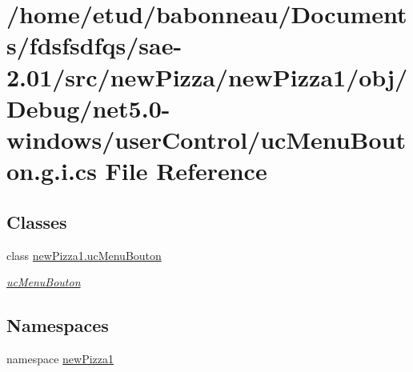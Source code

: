 \hypertarget{net5_80-windows_2userControl_2ucMenuBouton_8g_8i_8cs}{}\section{/home/etud/babonneau/\+Documents/fdsfsdfqs/sae-\/2.01/src/new\+Pizza/new\+Pizza1/obj/\+Debug/net5.0-\/windows/user\+Control/uc\+Menu\+Bouton.g.\+i.\+cs File Reference}
\label{net5_80-windows_2userControl_2ucMenuBouton_8g_8i_8cs}
\subsection*{Classes}
\begin{DoxyCompactItemize}
\item 
class \hyperlink{classnewPizza1_1_1ucMenuBouton}{new\+Pizza1.\+uc\+Menu\+Bouton}
\begin{DoxyCompactList}\small\item\em \hyperlink{classnewPizza1_1_1ucMenuBouton}{uc\+Menu\+Bouton} \end{DoxyCompactList}\end{DoxyCompactItemize}
\subsection*{Namespaces}
\begin{DoxyCompactItemize}
\item 
namespace \hyperlink{namespacenewPizza1}{new\+Pizza1}
\end{DoxyCompactItemize}
